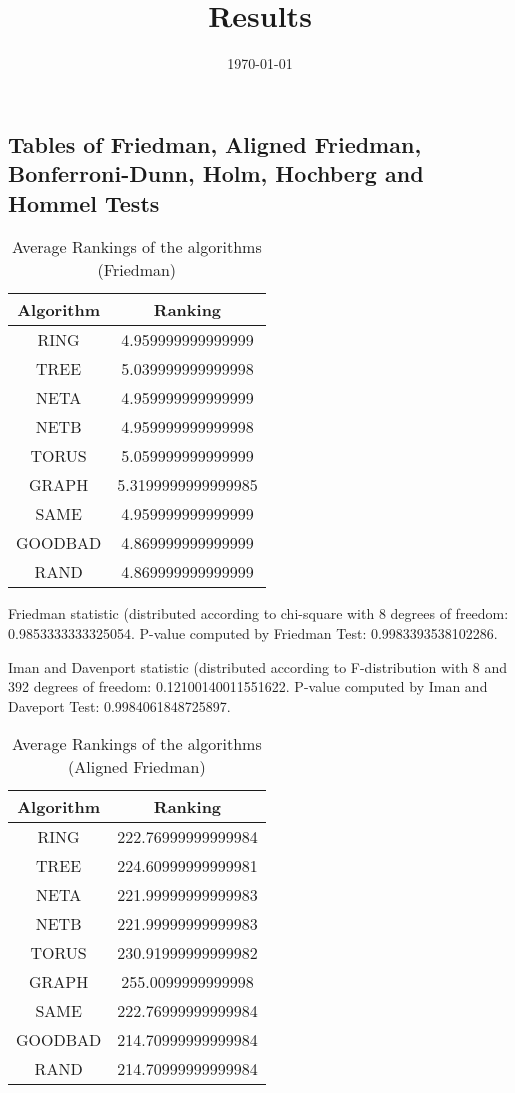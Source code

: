 \documentclass[a4paper,10pt]{article}
\title{Results}
\author{}
\date{\today}
\begin{document}
\begin{landscape}
\oddsidemargin 0in \topmargin 0in\maketitle
\section{Tables of Friedman, Aligned Friedman, Bonferroni-Dunn, Holm, Hochberg and Hommel Tests}
\begin{table}[!htp]
\centering
\caption{Average Rankings of the algorithms (Friedman)
}\begin{tabular}{c|c}
Algorithm&Ranking\\
\hline
 RING&4.959999999999999\\
 TREE&5.039999999999998\\
 NETA&4.959999999999999\\
 NETB&4.959999999999998\\
 TORUS&5.059999999999999\\
 GRAPH&5.3199999999999985\\
 SAME&4.959999999999999\\
 GOODBAD&4.869999999999999\\
 RAND&4.869999999999999\\
\end{tabular}
\end{table}


Friedman statistic (distributed according to chi-square with 8 degrees of freedom: 0.9853333333325054. 
P-value computed by Friedman Test: 0.9983393538102286.\newline

Iman and Davenport statistic (distributed according to F-distribution with 8 and 392 degrees of freedom: 0.12100140011551622. 
P-value computed by Iman and Daveport Test: 0.9984061848725897.\newline


\newpage

\begin{table}[!htp]
\centering
\caption{Average Rankings of the algorithms (Aligned Friedman)
}\begin{tabular}{c|c}
Algorithm&Ranking\\
\hline
 RING&222.76999999999984\\
 TREE&224.60999999999981\\
 NETA&221.99999999999983\\
 NETB&221.99999999999983\\
 TORUS&230.91999999999982\\
 GRAPH&255.0099999999998\\
 SAME&222.76999999999984\\
 GOODBAD&214.70999999999984\\
 RAND&214.70999999999984\\
\end{tabular}
\end{table}



\end{landscape}
\end{document}
